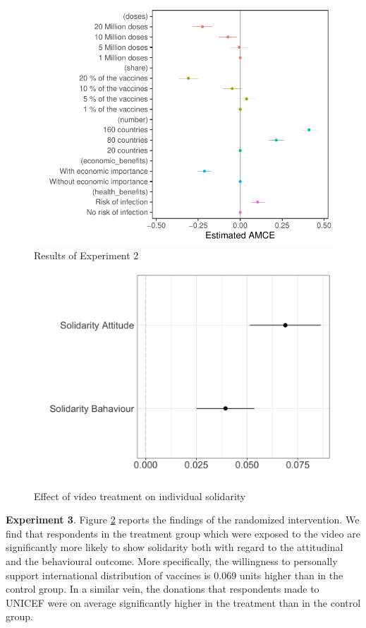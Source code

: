 \documentclass[12pt,oneside,smallheadings,chapterprefix=true]{article}
\begin{document}
\begin{figure}[hbt!]
\includegraphics[width=\linewidth]{"../2_output/amces.pdf"}
\caption{Results of Experiment 2}
\label{fig:conjoint_choice}
\end{figure}

\begin{figure}[hbt!]
\includegraphics[width=\linewidth]{2_figures/fig_video.png}
\caption{Effect of video treatment on individual solidarity}
\label{fig:video}
\end{figure}


\textbf{Experiment 3}. Figure \ref{fig:video} reports the findings of the randomized intervention. We find that respondents in the treatment group which were exposed to the video are significantly more likely to show solidarity both with regard to the attitudinal and the behavioural outcome. More specifically, the willingness to personally support international distribution of vaccines is 0.069 units higher than in the control group. In a similar vein, the donations that respondents made to UNICEF were on average significantly higher in the treatment than in the control group. 
\end{document}
